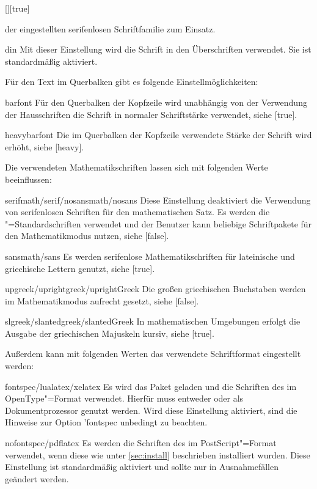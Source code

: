 \begin{Declaration}{[\PSet]}[true]
\begin{values}
  der eingestellten serifenlosen Schriftfamilie zum Einsatz.
\item[din]
  Mit dieser Einstellung wird die Schrift \DIN in den Überschriften verwendet. 
  Sie ist standardmäßig aktiviert.
\end{values}
%
Für den Text im Querbalken gibt es folgende Einstellmöglichkeiten:
%
\begin{values}
\item[barfont]
  Für den Querbalken der Kopfzeile wird unabhängig von der Verwendung der 
  Hausschriften die Schrift \Univers in normaler Schriftstärke verwendet,
  siehe [true].
\item[heavybarfont]
  Die im Querbalken der Kopfzeile verwendete Stärke der Schrift \Univers wird 
  erhöht, siehe [heavy].
\end{values}
%
Die verwendeten Mathematikschriften lassen sich mit folgenden Werte 
beeinflussen:
%
\begin{values}
\item[serifmath/serif/nosansmath/nosans]  
  Diese Einstellung deaktiviert die Verwendung von serifenlosen Schriften für 
  den mathematischen Satz. Es werden die "=Standardschriften 
  verwendet und der Benutzer kann beliebige Schriftpakete für den 
  Mathematikmodus nutzen, siehe [false].
\item[sansmath/sans]
  Es werden serifenlose Mathematikschriften für lateinische und griechische 
  Lettern genutzt, siehe [true].
\item[upgreek/uprightgreek/uprightGreek]
  Die großen griechischen Buchstaben werden im Mathematikmodus aufrecht gesetzt,
  siehe [false].
\item[slgreek/slantedgreek/slantedGreek]
  In mathematischen Umgebungen erfolgt die Ausgabe der griechischen Majuskeln 
  kursiv, siehe [true].
\end{values}
%
Außerdem kann mit folgenden Werten das verwendete Schriftformat eingestellt 
werden: 
%
\begin{values}
\item[fontspec/lualatex/xelatex]
  Es wird das Paket  geladen und die Schriften des \CDs im 
  OpenType"=Format verwendet. Hierfür muss entweder  oder 
   als Dokumentprozessor genutzt werden. Wird diese Einstellung 
  aktiviert, sind die Hinweise zur Option \Option'{fontspec} unbedingt zu 
  beachten.
\item[nofontspec/pdflatex]
  Es werden die Schriften des \CDs im PostScript"=Format verwendet, wenn diese 
  wie unter \autoref{sec:install} beschrieben installiert wurden. Diese 
  Einstellung ist standardmäßig aktiviert und sollte nur in Ausnahmefällen 
  geändert werden.
\end{values}
\end{Declaration}

